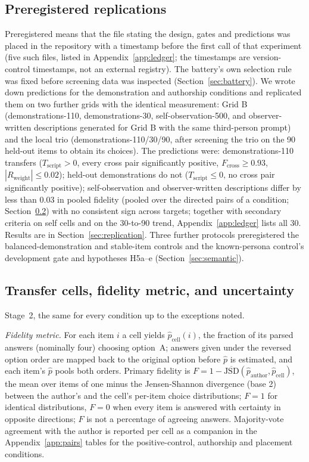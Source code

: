 \documentclass[11pt]{article}
\newcommand{\Fcross}{F_{\mathrm{cross}}}
\newcommand{\Tscript}{T_{\mathrm{script}}}
\newcommand{\Rweight}{R_{\mathrm{weight}}}
\begin{document}
\subsection{Preregistered replications}
\label{sec:prereg}
Preregistered means that the file stating the
design, gates and predictions was placed in the repository with a timestamp
before the first call of that experiment (five such files, listed in
Appendix~\ref{app:ledger}; the timestamps are version-control timestamps,
not an external registry). The battery's own selection rule was fixed
before screening data was inspected (Section~\ref{sec:battery}). We wrote down predictions for the
demonstration and authorship conditions and replicated them on two further
grids with the identical measurement: Grid B
(demonstrations-110, demonstrations-30, self-observation-500, and
observer-written descriptions generated for Grid B with the same
third-person prompt) and the local trio (demonstrations-110/30/90, after
screening the trio on the 90 held-out items to obtain its choices). The
predictions were: demonstrations-110 transfers ($\Tscript>0$,
every cross pair significantly positive, $\Fcross \ge 0.93$,
$|\Rweight| \le 0.02$); held-out demonstrations do not ($\Tscript \le 0$, no
cross pair significantly positive); self-observation and observer-written
descriptions differ by less than $0.03$ in pooled fidelity (pooled over the
directed pairs of a condition; Section~\ref{sec:cells}) with no consistent
sign across targets; together with secondary criteria on self cells and on
the 30-to-90 trend, Appendix~\ref{app:ledger} lists all 30. Results are in
Section~\ref{sec:replication}. Three
further protocols preregistered the balanced-demonstration and stable-item
controls and the known-persona control's development gate and hypotheses
H5a--e (Section~\ref{sec:semantic}).

\subsection{Transfer cells, fidelity metric, and uncertainty}
\label{sec:cells}
Stage~2, the same for every condition up to the exceptions noted.

\emph{Fidelity metric.} For each item $i$ a cell yields
$\hat p_{\text{cell}}(i)$, the fraction of its parsed answers (nominally
four) choosing option~A; answers given under the reversed option order are
mapped back to the original option before $\hat p$ is estimated, and each
item's $\hat p$ pools both orders. Primary fidelity is
$F = 1 - \overline{\mathrm{JSD}}(\hat p_{\text{author}}, \hat p_{\text{cell}})$,
the mean over items of one minus the Jensen-Shannon divergence (base 2)
between the author's and the cell's per-item choice distributions; $F=1$ for
identical distributions, $F=0$ when every item is answered with certainty in
opposite directions; $F$ is not a percentage of agreeing answers.
Majority-vote agreement with the author is reported per cell as a companion
in the Appendix~\ref{app:pairs} tables for the positive-control, authorship
and placement conditions.
\end{document}
